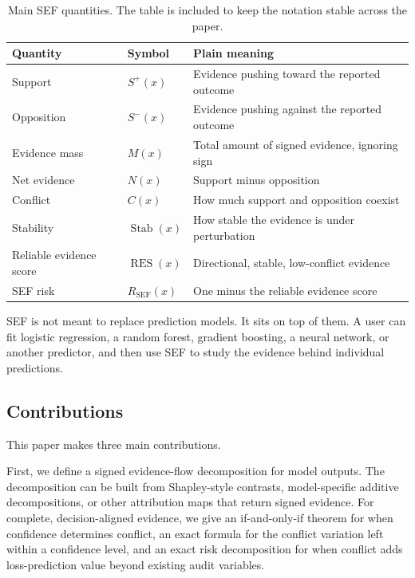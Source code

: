\documentclass[11pt]{article}
\begin{document}
\begin{table}[!htbp]
\centering
\caption{Main SEF quantities. The table is included to keep the notation stable across the paper.}
\label{tab:sef-notation}
\small
\begin{tabular}{p{}p{}p{}}
\toprule
Quantity & Symbol & Plain meaning \\
\midrule
Support & $S^+(x)$ & Evidence pushing toward the reported outcome \\
Opposition & $S^-(x)$ & Evidence pushing against the reported outcome \\
Evidence mass & $M(x)$ & Total amount of signed evidence, ignoring sign \\
Net evidence & $N(x)$ & Support minus opposition \\
Conflict & $C(x)$ & How much support and opposition coexist \\
Stability & $\operatorname{Stab}(x)$ & How stable the evidence is under perturbation \\
Reliable evidence score & $\operatorname{RES}(x)$ & Directional, stable, low-conflict evidence \\
SEF risk & $R_{\mathrm{SEF}}(x)$ & One minus the reliable evidence score \\
\bottomrule
\end{tabular}
\end{table}

SEF is not meant to replace prediction models. It sits on top of them. A user can fit logistic regression, a random forest, gradient boosting, a neural network, or another predictor, and then use SEF to study the evidence behind individual predictions.

\subsection{Contributions}

This paper makes three main contributions.

First, we define a signed evidence-flow decomposition for model outputs. The decomposition can be built from Shapley-style contrasts, model-specific additive decompositions, or other attribution maps that return signed evidence. For complete, decision-aligned evidence, we give an if-and-only-if theorem for when confidence determines conflict, an exact formula for the conflict variation left within a confidence level, and an exact risk decomposition for when conflict adds loss-prediction value beyond existing audit variables.
\end{document}
